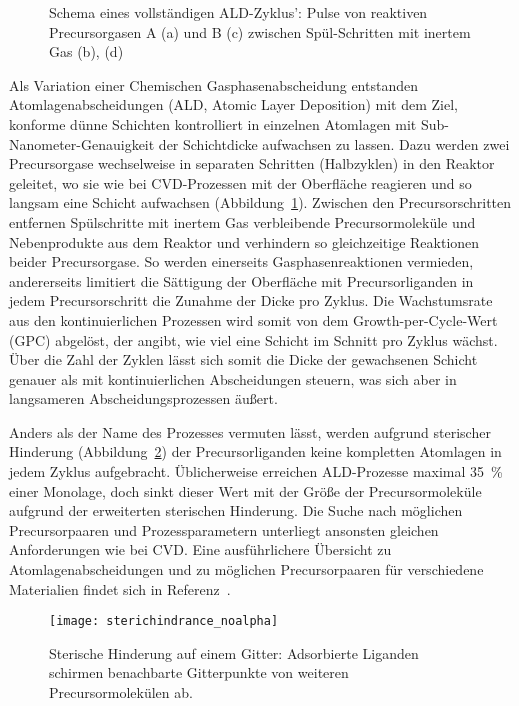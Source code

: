 \begin{figure}
  \centering
  \def\svgwidth{\textwidth}
  
  \caption[Schema eines vollständigen ALD-Zyklus']{
    Schema eines vollständigen ALD-Zyklus':
    Pulse von reaktiven Precursorgasen A (a) und B (c) zwischen Spül-Schritten mit inertem Gas (b), (d)
  }
  \label{fig:ald-schema}
\end{figure}

Als Variation einer Chemischen Gasphasenabscheidung entstanden Atomlagenabscheidungen (ALD, Atomic Layer Deposition) mit dem Ziel, konforme dünne Schichten kontrolliert in einzelnen Atomlagen mit Sub-Nanometer-Genauigkeit der Schichtdicke aufwachsen zu lassen.
Dazu werden zwei Precursorgase wechselweise in separaten Schritten (Halbzyklen) in den Reaktor geleitet, wo sie wie bei CVD-Prozessen mit der Oberfläche reagieren und so langsam eine Schicht aufwachsen (Abbildung~\ref{fig:ald-schema}).
Zwischen den Precursorschritten entfernen Spülschritte mit inertem Gas verbleibende Precursormoleküle und Nebenprodukte aus dem Reaktor und verhindern so gleichzeitige Reaktionen beider Precursorgase.
So werden einerseits Gasphasenreaktionen vermieden, andererseits limitiert die Sättigung der Oberfläche mit Precursorliganden in jedem Precursorschritt die Zunahme der Dicke pro Zyklus.
Die Wachstumsrate aus den kontinuierlichen Prozessen wird somit von dem Growth-per-Cycle-Wert (GPC) abgelöst, der angibt, wie viel eine Schicht im Schnitt pro Zyklus wächst.
Über die Zahl der Zyklen lässt sich somit die Dicke der gewachsenen Schicht genauer als mit kontinuierlichen Abscheidungen steuern, was sich aber in langsameren Abscheidungsprozessen äußert.

Anders als der Name des Prozesses vermuten lässt, werden aufgrund sterischer Hinderung (Abbildung~\ref{fig:sterichindrance}) der Precursorliganden keine kompletten Atomlagen in jedem Zyklus aufgebracht.
Üblicherweise erreichen ALD-Prozesse maximal \SI{35}{\percent} einer Monolage\cite{ylilammi_monolayer_1996}, doch sinkt dieser Wert mit der Größe der Precursormoleküle aufgrund der erweiterten sterischen Hinderung.
Die Suche nach möglichen Precursorpaaren und Prozessparametern unterliegt ansonsten gleichen Anforderungen wie bei CVD.
Eine ausführlichere Übersicht zu Atomlagenabscheidungen und zu möglichen Precursorpaaren für verschiedene Materialien findet sich in Referenz~\cite{puurunen_surface_2005}.

\begin{figure}
  \centering
  \texttt{[image: sterichindrance\_noalpha]}
  \caption[Sterische Hinderung auf einem Gitter]{
    Sterische Hinderung auf einem Gitter:
    Adsorbierte Liganden schirmen benachbarte Gitterpunkte von weiteren Precursormolekülen ab.
  }
  \label{fig:sterichindrance}
\end{figure}

